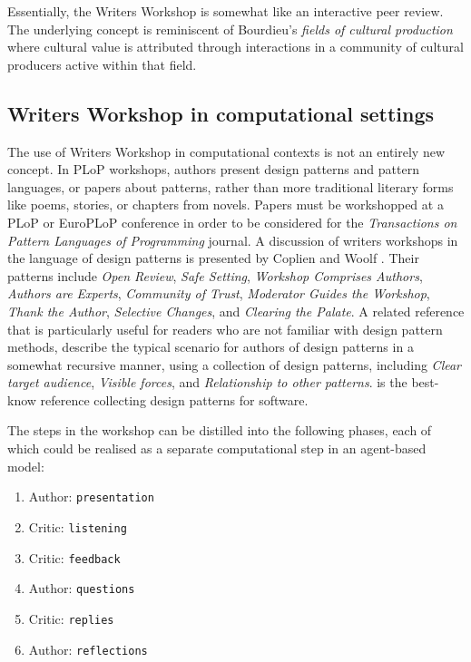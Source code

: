 Essentially, the Writers Workshop is somewhat like an interactive peer review. The underlying concept is reminiscent of Bourdieu's {\em fields of cultural production} \cite{bourdieu93} where cultural value is attributed through interactions in a community of cultural producers active within that field. 

\subsection{Writers Workshop in computational settings}
The use of Writers Workshop in computational contexts is not an
entirely new concept. In PLoP workshops, authors present design
patterns and pattern languages, or papers about patterns, rather than
more traditional literary forms like poems, stories, or chapters from
novels.  Papers must be workshopped at a PLoP or EuroPLoP conference
in order to be considered for the \emph{Transactions on Pattern
  Languages of Programming} journal.  A discussion of writers
workshops in the language of design patterns is presented by Coplien
and Woolf \citeyear{coplien1997pattern}.  Their patterns include
\emph{Open Review}, \emph{Safe Setting}, \emph{Workshop Comprises
  Authors}, \emph{Authors are Experts}, \emph{Community of Trust},
\emph{Moderator Guides the Workshop}, \emph{Thank the Author},
\emph{Selective Changes}, and \emph{Clearing the Palate}.
%
A related reference that is particularly useful for readers who are
not familiar with design pattern methods, 
describe the typical scenario for authors of design patterns in a
somewhat recursive manner, using a collection of design patterns,
including \emph{Clear target audience}, \emph{Visible forces}, and
\emph{Relationship to other patterns}.   is the
best-know reference collecting design patterns for software.

The steps in the workshop can be distilled into the following phases,
each of which could be realised as a separate computational step in an
agent-based model:
\begin{center}
\begin{fminipage}{.53\columnwidth}
\begin{enumerate}[itemsep=0pt]
\item Author: {\tt presentation}
\item Critic: {\tt listening}
\item Critic: {\tt feedback}
\item Author: {\tt questions}
\item Critic: {\tt replies}
\item Author: {\tt reflections}
\end{enumerate}
\end{fminipage}
\end{center}

